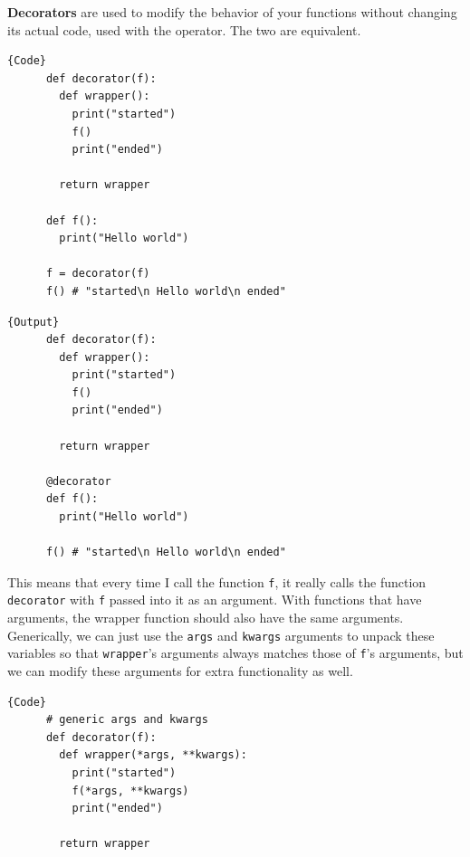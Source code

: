   \begin{definition}[Decorators]
    \label{def:decorators}
    \textbf{Decorators} are used to modify the behavior of your functions without changing its actual code, used with the \texttt{\@} operator. The two are equivalent. 

    \noindent\begin{minipage}{.5\textwidth}
    \begin{lstlisting}[]{Code}
      def decorator(f): 
        def wrapper(): 
          print("started") 
          f()
          print("ended") 

        return wrapper

      def f(): 
        print("Hello world") 

      f = decorator(f)
      f() # "started\n Hello world\n ended"
    \end{lstlisting}
    \end{minipage}
    \hfill
    \begin{minipage}{.49\textwidth}
    \begin{lstlisting}[]{Output}
      def decorator(f): 
        def wrapper(): 
          print("started") 
          f()
          print("ended") 

        return wrapper

      @decorator
      def f(): 
        print("Hello world") 

      f() # "started\n Hello world\n ended"
    \end{lstlisting}
    \end{minipage}

    This means that every time I call the function \texttt{f}, it really calls the function \texttt{decorator} with \texttt{f} passed into it as an argument. With functions that have arguments, the wrapper function should also have the same arguments. Generically, we can just use the \texttt{\*args} and \texttt{\*\*kwargs} arguments to unpack these variables so that \texttt{wrapper}'s arguments always matches those of \texttt{f}'s arguments, but we can modify these arguments for extra functionality as well. 

    \noindent\begin{minipage}{.5\textwidth}
    \begin{lstlisting}[]{Code}
      # generic args and kwargs
      def decorator(f): 
        def wrapper(*args, **kwargs): 
          print("started") 
          f(*args, **kwargs)
          print("ended") 

        return wrapper


\end{lstlisting}
\end{minipage}
\end{definition}
